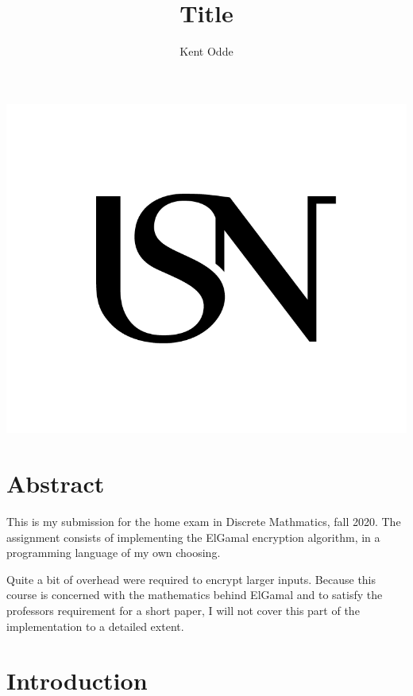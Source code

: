 \documentclass{article}
\begin{document}
\author{Kent Odde}
\title{Title}

\maketitle
\thispagestyle{empty}
\begin{center}
\includegraphics[width=\linewidth,height=0.2\textheight,keepaspectratio]{img/USN.png}
\end{center}
\newpage

\tableofcontents

\newpage

\section{Abstract}
This is my submission for the home exam in Discrete Mathmatics, fall 2020. The assignment consists of implementing the ElGamal encryption algorithm, in a programming language of my own choosing. 


Quite a bit of overhead were required to encrypt larger inputs. Because this course is concerned with the mathematics behind ElGamal and to satisfy the professors requirement for a short paper, I will not cover this part of the implementation to a detailed extent. 

\section{Introduction}
\end{document}
